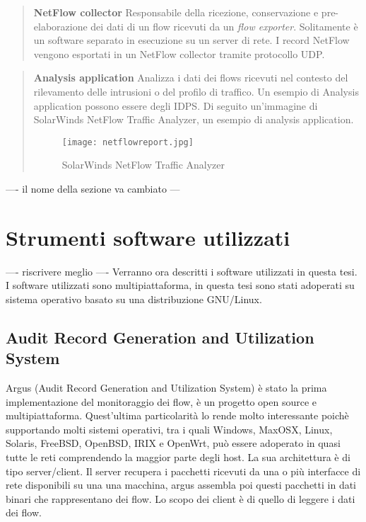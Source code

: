 \documentclass[../main.tex]{subfiles}
\begin{document}
\begin{verse}
\textbf{NetFlow collector}
Responsabile della ricezione, conservazione e pre-elaborazione dei dati di un flow ricevuti da un \textit{flow exporter}. Solitamente è un software separato in esecuzione su un server di rete. I record NetFlow vengono esportati in un NetFlow collector tramite protocollo UDP.
\end{verse}

\begin{verse}
\textbf{Analysis application} 
Analizza i dati dei flows ricevuti nel contesto del rilevamento delle intrusioni o del profilo di traffico. Un esempio di Analysis application possono essere degli IDPS.
Di seguito un'immagine di SolarWinds NetFlow Traffic Analyzer, un esempio di analysis application.

\begin{figure}[H]
\centering
\texttt{[image: netflowreport.jpg]}
\caption{SolarWinds NetFlow Traffic Analyzer}
\end{figure}
\end{verse}

---- il nome della sezione va cambiato ---
\section{Strumenti software utilizzati}
---- riscrivere meglio ----
Verranno ora descritti i software utilizzati in questa tesi. I software utilizzati sono multipiattaforma, in questa tesi sono stati adoperati su sistema operativo basato su una distribuzione GNU/Linux.

\subsection{Audit Record Generation and Utilization System}
Argus (Audit Record Generation and Utilization System) è stato la prima implementazione del monitoraggio dei flow, è un progetto open source e multipiattaforma.
Quest'ultima particolarità lo rende molto interessante poichè supportando molti sistemi operativi, tra i quali Windows, MaxOSX, Linux, Solaris, FreeBSD, OpenBSD, IRIX e OpenWrt, può essere adoperato in quasi tutte le reti comprendendo la maggior parte degli host. La sua architettura è di tipo server/client. Il server recupera i pacchetti ricevuti da una o più interfacce di rete disponibili su una una macchina, argus assembla poi questi pacchetti in dati binari che rappresentano dei flow. Lo scopo dei client è di quello di leggere i dati dei flow. \newline
\end{document}
